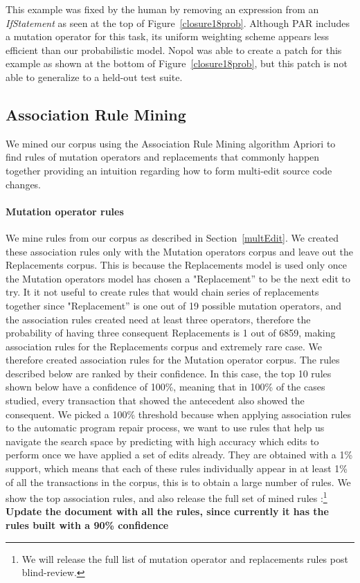 \documentclass[conference]{IEEEtran}
\newcommand{\todo}[1]
  {{\scriptsize \textbf{\color{red} {#1}}}}
\begin{document}
This example was fixed by the human by removing an expression from an
\emph{IfStatement} as seen at the top of Figure~\ref{closure18prob}. 
Although PAR includes a mutation operator for this task, its uniform
weighting scheme appears less efficient than our probabilistic model. Nopol was
able to create a patch for this example as shown at the bottom of 
Figure~\ref{closure18prob}, but this patch is not able to generalize to a
held-out test suite.

\subsection{Association Rule Mining} \label{armRes}

We mined our corpus using the Association Rule Mining algorithm Apriori 
to find rules of mutation operators and 
replacements that commonly happen together providing an intuition regarding
how to form multi-edit
source code changes.

\paragraph{Mutation operator rules}
We mine rules from our corpus as described in Section~\ref{multEdit}.  
We created these association rules only with the Mutation operators corpus and leave out the Replacements corpus.
This is because the Replacements model is used only once the Mutation operators model has chosen a "Replacement'' to
be the next edit to try. It it not useful to create rules that would chain series of replacements together since 
"Replacement'' is one out of 19 possible mutation operators, and the association rules created need at least three operators, therefore the probability of having three consequent
Replacements is 1 out of 6859, making association rules for the Replacements corpus and extremely rare case. 
We therefore created association rules for the Mutation operator corpus.
The rules described below are ranked by their confidence. In this case, the top 10 rules shown
below have a confidence of 100\%, meaning that in 100\% of the cases
studied, every transaction that showed the antecedent also showed the consequent. We picked a 100\%
threshold because when applying association rules to the automatic program repair process,
we want to use rules that help us navigate the search space by predicting 
with high accuracy which edits to perform once we 
have applied a set of edits already.
They are obtained with a 1\% support, which means that each of these rules
individually appear in at least 1\% of all the transactions in the
corpus, this is to obtain a large number of rules. We show the top association rules, and also release the full set of mined
rules :\footnote{We will release the full list of mutation operator and replacements rules post blind-review.} 
\todo{Update the document with all the rules, since currently it has the rules built with a 90\% confidence}
\end{document}
